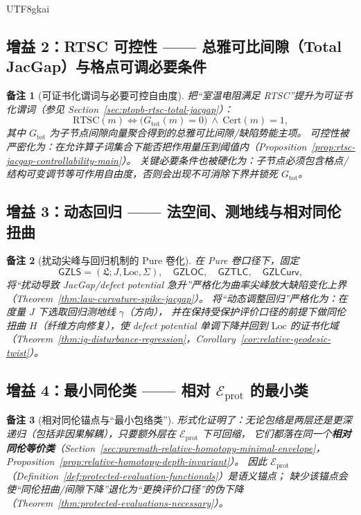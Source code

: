 \documentclass[12pt]{article}
\newtheorem{remark}{备注}[section]
\newcommand{\GZLS}{\ensuremath{\mathsf{GZLS}}}
\newcommand{\GZLOC}{\ensuremath{\mathsf{GZLOC}}}
\newcommand{\GZLCurv}{\ensuremath{\mathsf{GZLCurv}}}
\newcommand{\GZTLC}{\ensuremath{\mathsf{GZTLC}}}
\newcommand{\RTSC}{\textsf{RTSC}}
\begin{document}
\begin{CJK*}{UTF8}{gkai}
\subsection{增益 2：\RTSC{} 可控性 —— 总雅可比间隙（Total JacGap）与格点可调必要条件}

\begin{remark}[可证书化谓词与必要可控自由度]
把“室温电阻满足 \RTSC{}”提升为可证书化谓词（参见 Section~\ref{sec:ptopb-rtsc-total-jacgap}）：
\[
\mathrm{RTSC}(m)
\Longleftrightarrow
\bigl(G_{\mathrm{tot}}(m)=0\bigr)\ \wedge\ \mathrm{Cert}(m)=1,
\]
其中 $G_{\mathrm{tot}}$ 为子节点间隙向量聚合得到的总雅可比间隙/缺陷势能主项。
可控性被严密化为：在允许算子词集合下能否把作用量压到阈值内（Proposition~\ref{prop:rtsc-jacgap-controllability-main}）。
关键必要条件也被硬化为：子节点必须包含格点/结构可变调节等可作用自由度，否则会出现不可消除下界并锁死 $G_{\mathrm{tot}}$。
\end{remark}

\subsection{增益 3：动态回归 —— 法空间、测地线与相对同伦扭曲}

\begin{remark}[扰动尖峰与回归机制的 Pure 卷化]
在 Pure 卷口径下，固定
\[
\GZLS=(\mathfrak{L};J,\mathrm{Loc},\Sigma),\quad \GZLOC,\quad \GZTLC,\quad \GZLCurv,
\]
将“扰动导致 JacGap/defect potential 急升”严格化为曲率尖峰放大缺陷变化上界（Theorem~\ref{thm:law-curvature-spike-jacgap}）。
将“动态调整回归”严格化为：在度量 $J$ 下选取回归测地线 $\gamma$（方向），
并在保持受保护评价口径的前提下做同伦扭曲 $H$（纤维方向修复），使 defect potential 单调下降并回到 $\mathrm{Loc}$ 的证书化域（Theorem~\ref{thm:ig-disturbance-regression}，Corollary~\ref{cor:relative-geodesic-twist}）。
\end{remark}

\subsection{增益 4：最小同伦类 —— 相对 $\mathcal{E}_{\mathrm{prot}}$ 的最小类}

\begin{remark}[相对同伦锚点与“最小包络类”]
形式化证明了：无论包络是两层还是更深递归（包括非因果解耦），只要额外层在 $\mathcal{E}_{\mathrm{prot}}$ 下可回缩，
它们都落在同一个\textbf{相对同伦等价类}（Section~\ref{sec:puremath-relative-homotopy-minimal-envelope}，Proposition~\ref{prop:relative-homotopy-depth-invariant}）。
因此 $\mathcal{E}_{\mathrm{prot}}$（Definition~\ref{def:protected-evaluation-functionals}）是语义锚点；
缺少该锚点会使“同伦扭曲/间隙下降”退化为“更换评价口径”的伪下降（Theorem~\ref{thm:protected-evaluations-necessary}）。
\end{remark}


\end{CJK*}
\end{document}
